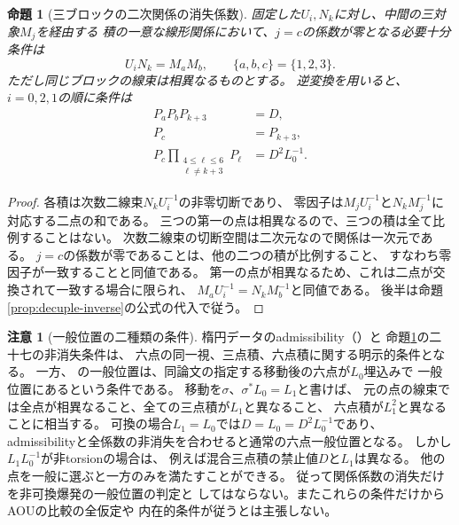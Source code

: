 \documentclass[11pt,a4paper]{ltjsarticle}
\newtheorem{proposition}[theorem]{命題}
\theoremstyle{definition}
\newtheorem{remark}[theorem]{注意}
\begin{document}
\begin{proposition}[三ブロックの二次関係の消失係数]
\label{prop:decuple-zero-coefficients}
固定した$U_i,N_k$に対し、中間の三対象$M_j$を経由する
積の一意な線形関係において、$j=c$の係数が零となる必要十分条件は
\[
 U_iN_k=M_aM_b,\qquad \{a,b,c\}=\{1,2,3\}.
\]
ただし同じブロックの線束は相異なるものとする。
逆変換を用いると、$i=0,2,1$の順に条件は
\begin{align*}
 P_aP_bP_{k+3}&=D,\\
 P_c&=P_{k+3},\\
 P_c\prod_{\substack{4\le\ell\le6\\\ell\ne k+3}}P_\ell
       &=D^2L_0^{-1}.
\end{align*}
\end{proposition}
\begin{proof}
各積は次数二線束$N_kU_i^{-1}$の非零切断であり、
零因子は$M_jU_i^{-1}$と$N_kM_j^{-1}$に対応する二点の和である。
三つの第一の点は相異なるので、三つの積は全て比例することはない。
次数二線束の切断空間は二次元なので関係は一次元である。
$j=c$の係数が零であることは、他の二つの積が比例すること、
すなわち零因子が一致することと同値である。
第一の点が相異なるため、これは二点が交換されて一致する場合に限られ、
$M_aU_i^{-1}=N_kM_b^{-1}$と同値である。
後半は命題\ref{prop:decuple-inverse}の公式の代入で従う。
\end{proof}

\begin{remark}[一般位置の二種類の条件]\label{rem:decuple-distinct-boundaries}
楕円データのadmissibility（\cite[Section~7]{AOU2024}）と
命題\ref{prop:decuple-zero-coefficients}の二十七の非消失条件は、
六点の同一視、三点積、六点積に関する明示的条件となる。
一方、\cite[Definition~11.1.2, Theorem~11.1.3]{VdBBlowup2001}
の一般位置は、同論文の指定する移動後の六点が$L_0$埋込みで
一般位置にあるという条件である。
移動を$\sigma$、$\sigma^*L_0=L_1$と書けば、
元の点の線束では全点が相異なること、全ての三点積が$L_1$と異なること、
六点積が$L_1^2$と異なることに相当する。
可換の場合$L_1=L_0$では$D=L_0=D^2L_0^{-1}$であり、
admissibilityと全係数の非消失を合わせると通常の六点一般位置となる。
しかし$L_1L_0^{-1}$が非torsionの場合は、
例えば混合三点積の禁止値$D$と$L_1$は異なる。
他の点を一般に選ぶと一方のみを満たすことができる。
従って関係係数の消失だけを非可換爆発の一般位置の判定と
してはならない。またこれらの条件だけからAOUの比較の全仮定や
内在的条件が従うとは主張しない。
\end{remark}






\end{document}
